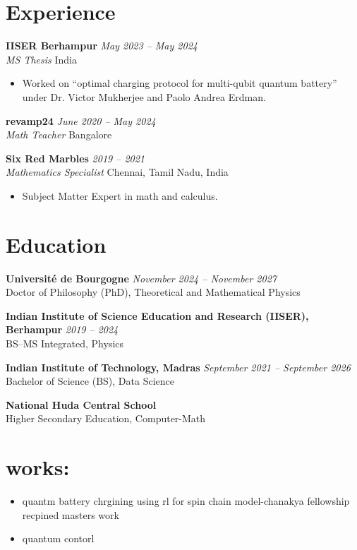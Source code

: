 \documentclass[11pt,a4paper]{article}
\begin{document}
\section*{Experience}
\textbf{IISER Berhampur} \hfill \textit{May 2023 -- May 2024}\\
\textit{MS Thesis} \hfill India
\begin{itemize}[leftmargin=1.5em]
    \item Worked on ``optimal charging protocol for multi-qubit quantum battery'' under Dr. Victor Mukherjee and Paolo Andrea Erdman.
\end{itemize}

\textbf{revamp24} \hfill \textit{June 2020 -- May 2024}\\
\textit{Math Teacher} \hfill Bangalore

\textbf{Six Red Marbles} \hfill \textit{2019 -- 2021}\\
\textit{Mathematics Specialist} \hfill Chennai, Tamil Nadu, India
\begin{itemize}[leftmargin=1.5em]
    \item Subject Matter Expert in math and calculus.
\end{itemize}

\section*{Education}
\textbf{Universit\'e de Bourgogne} \hfill \textit{November 2024 -- November 2027}\\
Doctor of Philosophy (PhD), Theoretical and Mathematical Physics

\textbf{Indian Institute of Science Education and Research (IISER), Berhampur} \hfill \textit{2019 -- 2024}\\
BS--MS Integrated, Physics

\textbf{Indian Institute of Technology, Madras} \hfill \textit{September 2021 -- September 2026}\\
Bachelor of Science (BS), Data Science

\textbf{National Huda Central School}\\
Higher Secondary Education, Computer-Math
\section{works:}
\begin{itemize}
    \item quantm battery chrgining using rl for spin chain model-chanakya fellowship recpined masters work
    \item quantum contorl
\end{itemize}
\end{document}
